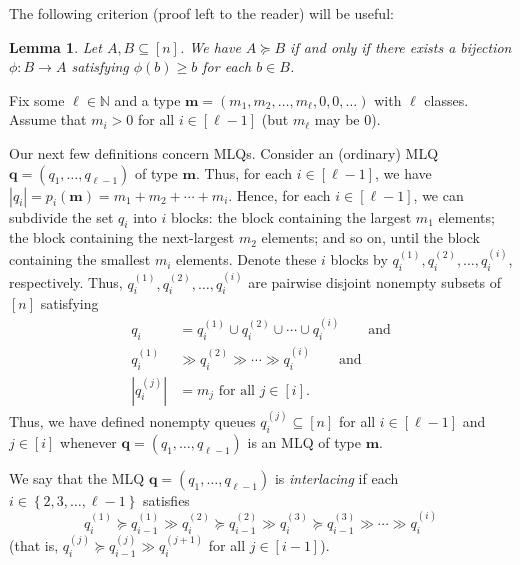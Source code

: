 \documentclass[reqno]{amsart}
\newcommand{\0}{\phantom{c}}
\newcommand{\mm}{\mathbf{m}}
\newcommand{\qq}{\mathbf{q}}
\newcommand{\NN}{\mathbb{N}}
\newcommand{\set}[1]{\left\{ #1 \right\}}
\newcommand{\abs}[1]{\left| #1 \right|}
\newcommand{\tup}[1]{\left( #1 \right)}
\newcommand{\ive}[1]{\left[ #1 \right]}
\newcommand{\defn}[1]{{\color{darkred}\emph{#1}}} %
\theoremstyle{plain}
\newtheorem{lemma}[thm]{Lemma}
\theoremstyle{definition}
\numberwithin{equation}{section}
\newcommand{\Darij}[1]{\todo[size=\tiny,inline,color=red!30]{#1
      \\ \hfill --- Darij}}
\begin{document}
The following criterion (proof left to the reader) will be useful:

\begin{lemma}
\label{lem:determinant_form.gale1}
Let $A, B \subseteq \ive{n}$.
We have $A \succeq B$ if and only if there exists a bijection $\phi \colon B \to A$ satisfying $\phi(b) \geq b$ for each $b \in B$.
\end{lemma}

Fix some $\ell \in \NN$ and a type $\mm = \tup{m_1,m_2, \dotsc, m_{\ell}, 0, 0, \ldots}$ with $\ell$ classes.
Assume that $m_i > 0$ for all $i \in \ive{\ell-1}$ (but $m_{\ell}$ may be $0$).

Our next few definitions concern MLQs.
Consider an (ordinary) MLQ $\qq = \tup{q_1,\ldots,q_{\ell-1}}$ of type $\mm$.
Thus, for each $i \in \ive{\ell-1}$, we have $\abs{q_i} = p_i(\mm) = m_1 + m_2 + \cdots + m_i$.
Hence, for each $i \in \ive{\ell-1}$, we can subdivide the set $q_i$ into $i$ blocks: the block containing the largest $m_1$ elements; the block containing the next-largest $m_2$ elements; and so on, until the block containing the smallest $m_i$ elements.
Denote these $i$ blocks by $q_i^{(1)}, q_i^{(2)}, \dotsc, q_i^{(i)}$, respectively.
Thus, $q_i^{(1)}, q_i^{(2)}, \dotsc, q_i^{(i)}$ are pairwise disjoint nonempty subsets of $\ive{n}$ satisfying
\begin{subequations}
\begin{align}
\label{eq.determinant_form.qij.1}
  q_i  & = q_i^{(1)} \cup q_i^{(2)} \cup \cdots \cup q_i^{(i)}
\qquad \text{and}
\\ \label{eq.determinant_form.qij.2}
  q_i^{(1)} & \gg q_i^{(2)} \gg \cdots \gg q_i^{(i)}
\qquad \text{and}
\\ \label{eq.determinant_form.qij.3}
  \abs{q_i^{(j)}} & = m_j \text{ for all } j \in \ive{i}.
\end{align}
\end{subequations}
Thus, we have defined nonempty queues $q_i^{(j)} \subseteq \ive{n}$ for all $i \in \ive{\ell-1}$ and $j \in \ive{i}$ whenever $\qq = \tup{q_1, \dotsc, q_{\ell-1}}$ is an MLQ of type $\mm$.

\Darij{TODO: Example.}

We say that the MLQ $\qq = \tup{q_1, \dotsc, q_{\ell-1}}$ is \defn{interlacing} if each $i \in \set{2,3,\dotsc,\ell-1}$ satisfies
\begin{equation}
\label{eq.determinant_form.interlacing.def}
q_i^{(1)} \succeq q_{i-1}^{(1)} \gg
q_i^{(2)} \succeq q_{i-1}^{(2)} \gg
q_i^{(3)} \succeq q_{i-1}^{(3)} \gg \cdots \gg
q_i^{(i)}
\end{equation}
(that is, $q_i^{(j)} \succeq q_{i-1}^{(j)} \gg q_i^{(j+1)}$ for all $j \in \ive{i-1}$).
\end{document}
